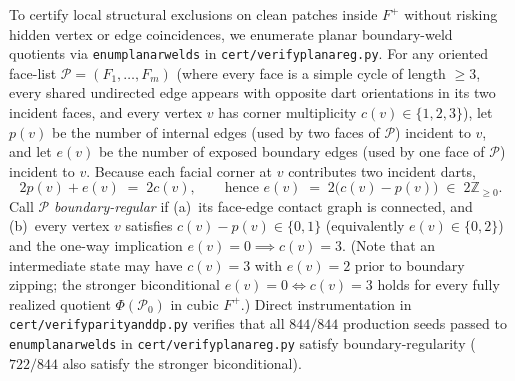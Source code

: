 \documentclass[11pt,reqno]{amsart}
\theoremstyle{plain}
\theoremstyle{definition}
\theoremstyle{remark}
\DeclareRobustCommand{\_}{\ifmmode\text{\textunderscore}\else\textunderscore\allowbreak\fi}
\begin{document}
To certify local structural exclusions on clean patches inside $F^+$ without risking hidden vertex or edge coincidences, we enumerate planar boundary-weld quotients via \texttt{enum\_planar\_welds} in \texttt{cert/verify\_planar\_eg.py}. For any oriented face-list $\mathcal{P} = (F_1, \dots, F_m)$ (where every face is a simple cycle of length $\ge 3$, every shared undirected edge appears with opposite dart orientations in its two incident faces, and every vertex $v$ has corner multiplicity $c(v) \in \{1, 2, 3\}$), let $p(v)$ be the number of internal edges (used by two faces of $\mathcal{P}$) incident to $v$, and let $e(v)$ be the number of exposed boundary edges (used by one face of $\mathcal{P}$) incident to $v$. Because each facial corner at $v$ contributes two incident darts,
\begin{equation}\label{eq:dart-parity}
  2 p(v) + e(v) \;=\; 2 c(v), \qquad\text{hence } e(v) \;=\; 2\bigl(c(v) - p(v)\bigr) \;\in\; 2\mathbb{Z}_{\ge 0}.
\end{equation}
Call $\mathcal{P}$ \emph{boundary-regular} if (a)~its face-edge contact graph is connected, and (b)~every vertex $v$ satisfies $c(v) - p(v) \in \{0, 1\}$ (equivalently $e(v) \in \{0, 2\}$) and the one-way implication $e(v) = 0 \implies c(v) = 3$. (Note that an intermediate state may have $c(v) = 3$ with $e(v) = 2$ prior to boundary zipping; the stronger biconditional $e(v) = 0 \iff c(v) = 3$ holds for every fully realized quotient $\Phi(\mathcal{P}_0)$ in cubic $F^+$.) Direct instrumentation in \texttt{cert/verify\_parity\_and\_dp.py} verifies that all $844/844$ production seeds passed to \texttt{enum\_planar\_welds} in \texttt{cert/verify\_planar\_eg.py} satisfy boundary-regularity ($722/844$ also satisfy the stronger biconditional).
\end{document}
